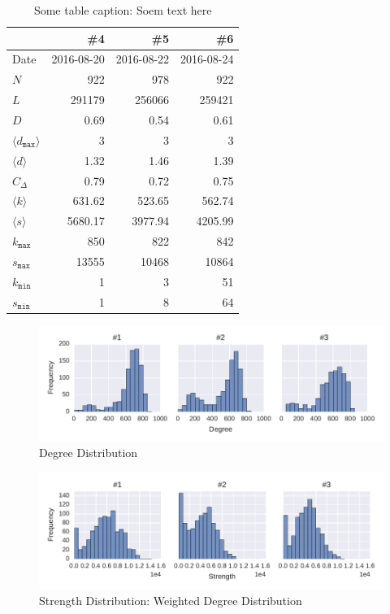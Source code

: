 \begin{table}
\centering
\begin{tabular}{lrrr}
\toprule
{} &        \#4 &        \#5 &        \#6 \\
\midrule
Date             &     2016-08-20 &     2016-08-22 &     2016-08-24 \\
$N$            &      922 &      978 &      922 \\
$L$            &   291179 &   256066 &   259421 \\
$D$          &     0.69 &     0.54 &     0.61 \\
$\langle d_{\texttt{max}} \rangle$         &        3 &        3 &        3 \\
$\langle d \rangle$ &     1.32 &     1.46 &     1.39 \\
$C_\Delta$              &     0.79 &     0.72 &     0.75 \\
$ \langle k \rangle$       &   631.62 &   523.65 &   562.74 \\
$ \langle s \rangle$       &  5680.17 &  3977.94 &  4205.99 \\
$k_{\texttt{max}}$           &      850 &      822 &      842 \\
$s_{\texttt{max}}$          &    13555 &    10468 &    10864 \\
 $k_{\texttt{min}}$           &        1 &        3 &       51 \\
$s_{\texttt{min}}$          &        1 &        8 &       64 \\
\bottomrule
\end{tabular}
\caption{Some table caption: Soem text here}
\label{tab:stats}
\end{table}

\begin{figure}[htb]
	\centering
	\includegraphics[width=1.0\textwidth]{Figures/stat-degreeDist}
	\caption[Degree Distribution]{Degree Distribution}
	\label{fig:statDegreeDist}
\end{figure}


\begin{figure}[htb]
	\centering
	\includegraphics[width=1.0\textwidth]{Figures/stat-strengthDist}
	\caption[Strength Distribution]{Strength Distribution: Weighted Degree Distribution}
	\label{fig:statStrengthDist}
\end{figure}

